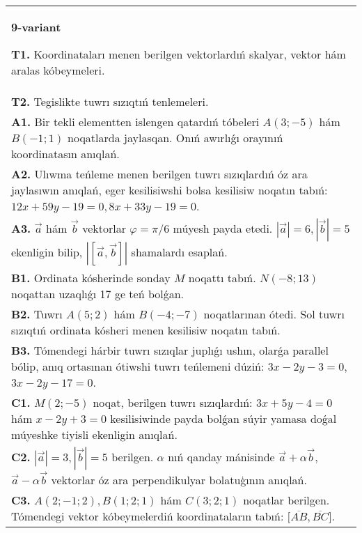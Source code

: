 \documentclass{article}
\begin{document}
\begin{tabular}{m{17cm}}
\textbf{9-variant}

\textbf{T1.} 
Koordinataları menen berilgen vektorlardıń skalyar, vektor hám aralas kóbeymeleri.
 \\
\textbf{T2.} 
Tegislikte tuwrı sızıqtıń tenlemeleri.
 \\
\textbf{A1.} 
Bir tekli elementten islengen qatardıń tóbeleri
$A (3;-5) $ hám $B (-1;1) $ noqatlarda jaylasqan. Onıń awırlıǵı
orayınıń koordinatasın anıqlań.
 \\
\textbf{A2.} 
Ulıwma teńleme menen berilgen tuwrı sızıqlardıń
óz ara jaylasıwın anıqlań, eger kesilisiwshi bolsa kesilisiw noqatın
tabıń: $12x+59y-19=0, 8x+33y-19=0$.
 \\
\textbf{A3.} 
$\overrightarrow{a}$ hám $\overrightarrow{b}$ vektorlar
$\varphi = \pi/6$ múyesh payda etedi.
$|\overrightarrow{a}| = 6,|\overrightarrow{b}| = 5$ ekenligin bilip,
$\left| \left\lbrack \overrightarrow{a},\overrightarrow{b} \right\rbrack \right|$ shamalardı esaplań.
 \\
\textbf{B1.} 
Ordinata kósherinde sonday $M$ noqattı tabıń.
\(N (-8;13) \) noqattan uzaqlıǵı 17 ge teń bolǵan.
 \\
\textbf{B2.} 
Tuwrı \(A (5;2) \) hám \(B (-4; -7) \) noqatlarınan ótedi.
Sol tuwrı sızıqtıń ordinata kósheri menen kesilisiw noqatın tabıń.
 \\
\textbf{B3.} 
Tómendegi hárbir tuwrı sızıqlar juplıǵı ushın, olarǵa parallel
bólip, anıq ortasınan ótiwshi tuwrı teńlemeni dúziń: $3x-2y-3=0$, $3x-2y-17=0$.
 \\
\textbf{C1.} 
\(M (2;-5) \) noqat, berilgen tuwrı sızıqlardıń:
\(3x+5y-4=0\) hám \(x-2y+3=0\) kesilisiwinde payda 
bolǵan súyir yamasa doǵal múyeshke tiyisli ekenligin anıqlań.
 \\
\textbf{C2.} 
$|\vec{a}| = 3,|\vec{b}| = 5$ berilgen. $\alpha$ nıń qanday mánisinde $\vec{a} + \alpha\vec{b}$, $\vec{a} - \alpha\vec{b}$ vektorlar óz ara perpendikulyar bolatuģının anıqlań.
 \\
\textbf{C3.} 
$A (2; -1;2), B (1;2; 1) $ hám $C (3;2;1) $ noqatlar berilgen. Tómendegi vektor kóbeymelerdiń koordinataların tabıń:
$\lbrack\overline{AB},\overline{BC}\rbrack$.
 \\

\end{tabular}
\vspace{1cm}
\end{document}
